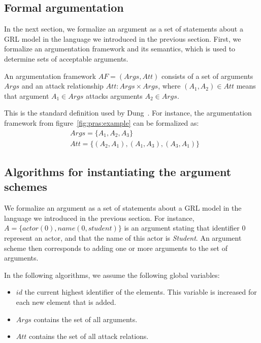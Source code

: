 \subsection{Formal argumentation}

In the next section, we formalize an argument as a set of statements about a GRL model in the language we introduced in the previous section. First, we formalize an argumentation framework and its semantics, which is used to determine sets of acceptable arguments.

\begin{definition}
An argumentation framework $AF=(Args,Att)$ consists of a set of arguments $Args$ and an attack relationship $Att:Args\times Args$, where $(A_1,A_2)\in Att$ means that argument $A_1\in Args$ attacks arguments $A_2\in Args$.
\end{definition}

\rationale{} This is the standard definition used by Dung~\cite{Dung1995}. For instance, the argumentation framework from figure~\ref{fig:pras:example} can be formalized as:
\begin{align*}
&Args=\{A_1,A_2,A_3\}\\
&Att = \{(A_2,A_1),(A_1,A_3),(A_3,A_1)\}
\end{align*}


\subsection{Algorithms for instantiating the argument schemes}

We formalize an argument as a set of statements about a GRL model in the language we introduced in the previous section. For instance, $A= \{actor(0), name(0,student)\}$ is an argument stating that identifier 0 represent an actor, and that the name of this actor is \emph{Student}. An argument scheme then corresponds to adding one or more arguments to the set of arguments.

In the following algorithms, we assume the following global variables:
\begin{itemize}
\item $id$ the current highest identifier of the elements. This variable is increased for each new element that is added.
\item $Args$ contains the set of all arguments.
\item $Att$ contains the set of all attack relations.
\end{itemize}

